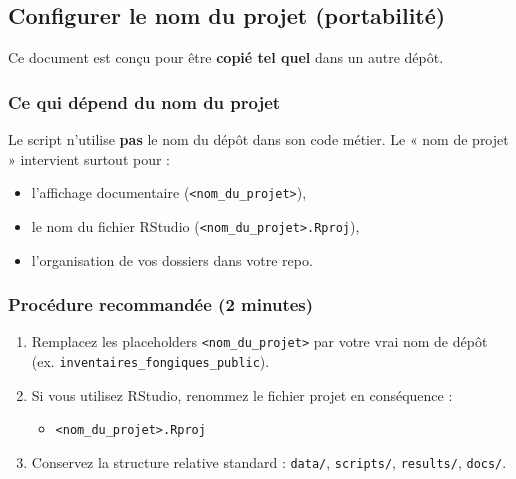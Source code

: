 \subsection{Configurer le nom du projet
(portabilité)}\label{configurer-le-nom-du-projet-portabilituxe9}

Ce document est conçu pour être \textbf{copié tel quel} dans un autre
dépôt.

\subsubsection{Ce qui dépend du nom du
projet}\label{ce-qui-duxe9pend-du-nom-du-projet}

Le script n'utilise \textbf{pas} le nom du dépôt dans son code métier.
Le « nom de projet » intervient surtout pour :

\begin{itemize}
\tightlist
\item
  l'affichage documentaire
  (\texttt{\textless{}nom\_du\_projet\textgreater{}}),
\item
  le nom du fichier RStudio
  (\texttt{\textless{}nom\_du\_projet\textgreater{}.Rproj}),
\item
  l'organisation de vos dossiers dans votre repo.
\end{itemize}

\subsubsection{Procédure recommandée (2
minutes)}\label{procuxe9dure-recommanduxe9e-2-minutes}

\begin{enumerate}
\def\labelenumi{\arabic{enumi}.}
\tightlist
\item
  Remplacez les placeholders
  \texttt{\textless{}nom\_du\_projet\textgreater{}} par votre vrai nom
  de dépôt (ex. \texttt{inventaires\_fongiques\_public}).
\item
  Si vous utilisez RStudio, renommez le fichier projet en conséquence :

  \begin{itemize}
  \tightlist
  \item
    \texttt{\textless{}nom\_du\_projet\textgreater{}.Rproj}
  \end{itemize}
\item
  Conservez la structure relative standard : \texttt{data/},
  \texttt{scripts/}, \texttt{results/}, \texttt{docs/}.
\end{enumerate}


